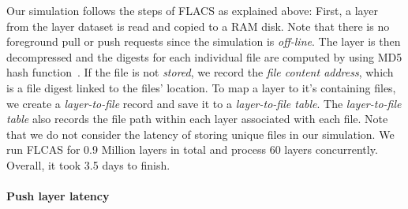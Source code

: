 % 

Our simulation follows the steps of FLACS as explained above:
First, a layer from the layer dataset is read and copied
to a RAM disk. 
Note that there is no foreground pull or push requests since the simulation is \emph{off-line}.
The layer is then decompressed and 
the digests for each individual file are computed by using MD5 hash function~\cite{MD5}.
%
If the file is not \emph{stored},
we record the \emph{file content address}, which is a
file digest linked to the files' location.
%
To map a layer to it's containing files, we create a \emph{layer-to-file} record
and save it
to a \emph{layer-to-file table}.
%
The \emph{layer-to-file table} also
records the file path within each layer associated with each file.
%
Note that we do not consider the latency of storing unique files in our simulation.
%
%
We run FLCAS for 0.9 Million layers in total and process 60 layers concurrently. 
%
Overall, it took 3.5 days to finish.
%
%

%
%
%
%

\paragraph{Push layer latency}

